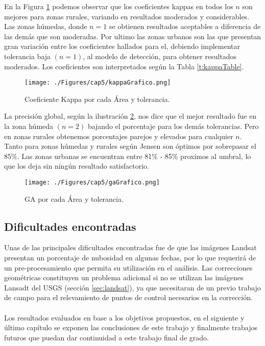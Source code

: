 En la Figura \ref{fig:kappaGrafico} podemos observar que los coeficientes kappas en todos los $ n  $ son mejores para zonas rurales, variando en resultados moderados y considerables. Las zonas h\'umedas, donde $ n=1 $ se obtienen resultados aceptables a diferencia de las dem\'as que son moderadas. Por ultimo las zonas urbanos son las que presentan gran variaci\'on entre los coeficientes hallados para el, debiendo implementar tolerancia baja $(n=1)$, al modelo de detecci\'on, para obtener resultados moderados. Los coeficientes son interpretados seg\'un la Tabla \ref{t:kappaTable}.
\begin{figure}[H]
	\centering
	\texttt{[image: ./Figures/cap5/kappaGrafico.png]}
	\caption{Coeficiente Kappa por cada \'Area y tolerancia.}
	\label{fig:kappaGrafico}
\end{figure}
La precisi\'on global, seg\'un la ilustraci\'on \ref{fig:gaGrafico}, nos dice que el mejor resultado fue en la zona h\'umeda $ (n=2) $ bajando el porcentaje para los dem\'as tolerancias. Pero en zonas rurales obtenemos porcentajes parejos y elevados para cualquier $ n $. Tanto para zonas h\'umedas y rurales seg\'un Jensen \cite{jensen1981urban} son \'optimos por sobrepasar el 85\%. Las zonas urbanas se encuentran entre 81\% - 85\% proximos al umbral, lo que los deja sin ning\'un resultado satisfactorio.
\begin{figure}[H]
	\centering
	\texttt{[image: ./Figures/cap5/gaGrafico.png]}
	\caption{GA por cada \'Area y tolerancia.}
	\label{fig:gaGrafico}
\end{figure}
\subsection{Dificultades encontradas} 
Unas de las principales dificultades encontradas fue de que las im\'agenes Landsat presentan un porcentaje de nubosidad en algunas fechas, por lo que requerir\'a de un pre-procesamiento que permita su utilizaci\'on en el an\'alisis. Las correcciones geom\'etricas constituyen un problema adicional si no se utilizan las im\'agenes Lansadt del USGS (secci\'on \ref{sec:landsat}), ya que necesitaran de un previo trabajo de campo para el relevamiento de puntos de control necesarios en la correcci\'on.\\~\\
Los resultados evaluados en base a los objetivos propuestos, en el siguiente y \'ultimo cap\'itulo se exponen las conclusiones de este trabajo  y finalmente trabajos futuros que puedan dar continuidad a este trabajo final de grado.
